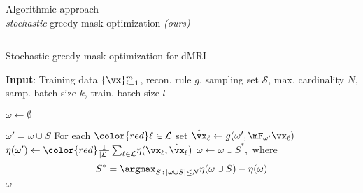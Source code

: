 \begin{frame}{Algorithmic approach\\[-3mm] {\normalsize \textit{stochastic} greedy mask optimization \textit{(ours)}}}
\begin{columns}[T]
\vspace{-.6cm}
\begin{algorithm}[H]
\caption{Stochastic greedy mask optimization for dMRI \parencite{sanchez2019scalable}}\label{alg:1}
{\footnotesize  \textbf{Input}: Training data $\{\vx\}_{i=1}^m$, recon. rule $g$, sampling set $\mathcal{S}$, max. cardinality $N$,  {\color{red} samp. batch size $k$, train. batch size $l$}} %
\begin{algorithmic}[1]
\State $\omega \leftarrow \emptyset$
        
     
        \State  $\omega' = \omega \cup S$ 
        \State For each $ \color{red} \ell \in \mathcal{L}$ set ${\hat{\vx}}_\ell\leftarrow g(\omega', \mF_{\omega'} \vx_\ell)$
        \State   $\eta(\omega') \leftarrow  {\color{red} \frac{1}{|\mathcal{L}|} \sum_{\ell\in\mathcal{L}} }\eta(\vx_\ell, {\hat{\vx}}_\ell)$
 \EndFor
 \State $\displaystyle\omega \leftarrow \omega \cup S^*,  \text{ where }$    
    \vspace{-3mm}
    \begin{equation*}
        S^* = \argmax_{S\,:\,|\omega \cup S| \le N}  \eta(\omega \cup S) - \eta(\omega)%
    \end{equation*}\vspace{-5mm}
    \EndWhile
{} $\omega$ 
\end{algorithmic}
\end{algorithm} 
\vspace{1cm}


\end{columns}
\end{frame}
